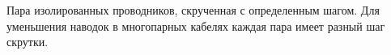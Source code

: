 Пара изолированных проводников, скрученная с определенным 
шагом. Для уменьшения наводок в многопарных кабелях каждая пара 
имеет разный шаг скрутки.